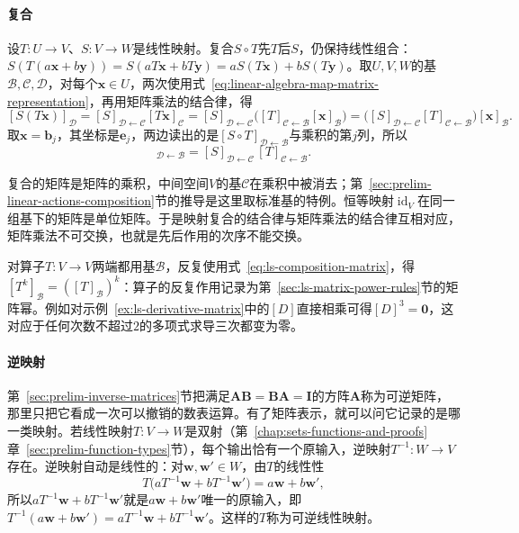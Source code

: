 \paragraph{复合}
设$T:U\to V$、$S:V\to W$是线性映射。复合$S\circ T$先$T$后$S$，仍保持线性组合：$S(T(a\bm x+b\bm y))=S(aT\bm x+bT\bm y)=aS(T\bm x)+bS(T\bm y)$。取$U,V,W$的基$\mathcal B,\mathcal C,\mathcal D$，对每个$\bm x\in U$，两次使用式~\eqref{eq:linear-algebra-map-matrix-representation}，再用矩阵乘法的结合律，得
\[
 [S(T\bm x)]_{\mathcal D}
 =[S]_{\mathcal D\leftarrow\mathcal C}[T\bm x]_{\mathcal C}
 =[S]_{\mathcal D\leftarrow\mathcal C}\bigl([T]_{\mathcal C\leftarrow\mathcal B}[\bm x]_{\mathcal B}\bigr)
 =\bigl([S]_{\mathcal D\leftarrow\mathcal C}[T]_{\mathcal C\leftarrow\mathcal B}\bigr)[\bm x]_{\mathcal B}.
\]
取$\bm x=\bm b_j$，其坐标是$\bm e_j$，两边读出的是$[S\circ T]_{\mathcal D\leftarrow\mathcal B}$与乘积的第$j$列，所以
\begin{equation}
 [S\circ T]_{\mathcal D\leftarrow\mathcal B}
 =[S]_{\mathcal D\leftarrow\mathcal C}\,[T]_{\mathcal C\leftarrow\mathcal B}.
 \label{eq:ls-composition-matrix}
\end{equation}

复合的矩阵是矩阵的乘积，中间空间$V$的基$\mathcal C$在乘积中被消去；第~\ref{sec:prelim-linear-actions-composition}节的推导是这里取标准基的特例。恒等映射$\operatorname{id}_V$在同一组基下的矩阵是单位矩阵。于是映射复合的结合律与矩阵乘法的结合律互相对应，矩阵乘法不可交换，也就是先后作用的次序不能交换。

对算子$T:V\to V$两端都用基$\mathcal B$，反复使用式~\eqref{eq:ls-composition-matrix}，得$[T^k]_{\mathcal B}=([T]_{\mathcal B})^k$：算子的反复作用记录为第~\ref{sec:ls-matrix-power-rules}节的矩阵幂。例如对示例~\ref{ex:ls-derivative-matrix}中的$[D]$直接相乘可得$[D]^3=\bm0$，这对应于任何次数不超过$2$的多项式求导三次都变为零。

\paragraph{逆映射}
第~\ref{sec:prelim-inverse-matrices}节把满足$\bm A\bm B=\bm B\bm A=\bm I$的方阵$\bm A$称为可逆矩阵，那里只把它看成一次可以撤销的数表运算。有了矩阵表示，就可以问它记录的是哪一类映射。若线性映射$T:V\to W$是双射（第~\ref{chap:sets-functions-and-proofs}章~\ref{sec:prelim-function-types}节），每个输出恰有一个原输入，逆映射$T^{-1}:W\to V$存在。逆映射自动是线性的：对$\bm w,\bm w'\in W$，由$T$的线性性
\[
 T\bigl(aT^{-1}\bm w+bT^{-1}\bm w'\bigr)=a\bm w+b\bm w',
\]
所以$aT^{-1}\bm w+bT^{-1}\bm w'$就是$a\bm w+b\bm w'$唯一的原输入，即$T^{-1}(a\bm w+b\bm w')=aT^{-1}\bm w+bT^{-1}\bm w'$。这样的$T$称为可逆线性映射。

